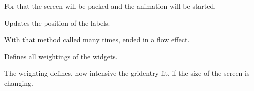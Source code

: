 \documentclass[letterpaper,10pt,english]{sphinxmanual}
\begin{document}
\begin{fulllineitems}
\begin{fulllineitems}
\sphinxAtStartPar
For that the screen will be packed and the animation will be started.

\end{fulllineitems}


\begin{fulllineitems}
\label{\detokenize{anoog.automation:anoog.automation.graphical_user_interface.Credits_Window.update_show}}
\sphinxAtStartPar
Updates the position of the labels.

\sphinxAtStartPar
With that method called many times, ended in a flow effect.

\end{fulllineitems}


\begin{fulllineitems}
\label{\detokenize{anoog.automation:anoog.automation.graphical_user_interface.Credits_Window.weighting}}
\sphinxAtStartPar
Defines all weightings of the widgets.

\sphinxAtStartPar
The weighting defines, how intensive the grid\sphinxhyphen{}entry fit, if the size of the screen is changing.

\end{fulllineitems}


\end{fulllineitems}

\end{document}
